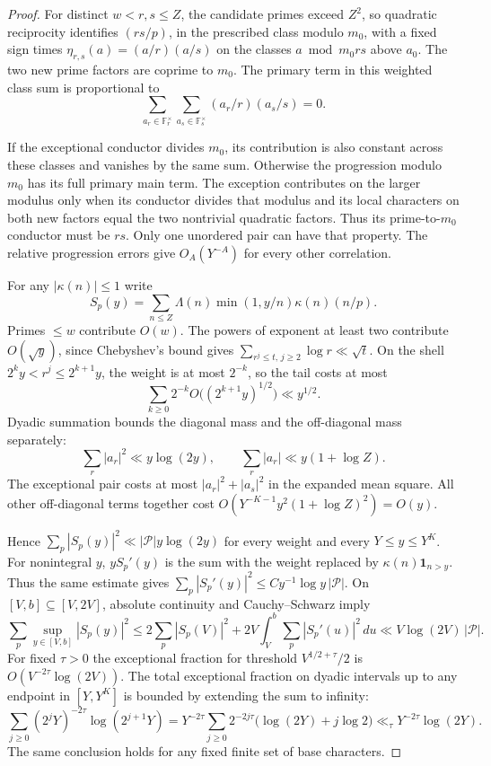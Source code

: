 \begin{proof}
For distinct \(w<r,s\le Z\), the candidate primes exceed \(Z^2\),
so quadratic reciprocity identifies \((rs/p)\), in the prescribed
class modulo \(m_0\), with a fixed sign times
\(\eta_{r,s}(a)=(a/r)(a/s)\) on the classes \(a\bmod m_0rs\)
above \(a_0\). The two new prime factors are coprime to \(m_0\).
The primary term in this weighted class sum is proportional to
\[
       \sum_{a_r\in\mathbb F_r^\times}
       \sum_{a_s\in\mathbb F_s^\times}(a_r/r)(a_s/s)=0.
\]

If the exceptional conductor divides \(m_0\), its contribution is
also constant across these classes and vanishes by the same sum.
Otherwise the progression modulo \(m_0\) has its full primary
main term. The exception contributes on the larger modulus only
when its conductor divides that modulus and its local characters
on both new factors equal the two nontrivial quadratic factors.
Thus its prime-to-\(m_0\) conductor must be \(rs\).
Only one unordered pair can have that property. The relative
progression errors give \(O_A(Y^{-A})\) for every other correlation.

For any \(|\kappa(n)|\le1\) write
\[
 S_p(y)=\sum_{n\le Z}\Lambda(n)\min(1,y/n)\kappa(n)(n/p).
\]
Primes \(\le w\) contribute \(O(w)\). The powers of exponent at
least two contribute \(O(\sqrt y)\), since Chebyshev's bound gives
\(\sum_{r^j\le t,\,j\ge2}\log r\ll\sqrt t\).
On the shell \(2^k y<r^j\le2^{k+1}y\), the weight is at most
\(2^{-k}\), so the tail costs at most
\[
 \sum_{k\ge0}2^{-k} O\bigl((2^{k+1}y)^{1/2}\bigr)\ll y^{1/2}.
\] Dyadic summation bounds the diagonal mass and the off-diagonal mass separately:
\[
 \sum_r |a_r|^2\ll y\log(2y),\qquad \sum_r |a_r|\ll y(1+\log Z).
\]
The exceptional pair costs at
most \(|a_r|^2+|a_s|^2\) in the expanded mean square. All other
off-diagonal terms together cost
\(O(Y^{-K-1}y^2(1+\log Z)^2)=O(y)\).

Hence \(\sum_p|S_p(y)|^2\ll |\mathcal P| y\log(2y)\) for every
weight and every \(Y\le y\le Y^K\). For nonintegral
\(y\), \(yS_p'(y)\) is the sum with the weight replaced by
\(\kappa(n)\mathbf 1_{n>y}\). Thus the same estimate gives
\(\sum_p |S_p'(y)|^2\le C y^{-1}\log y\,|\mathcal P|\).
On \([V,b]\subseteq[V,2V]\), absolute continuity and
Cauchy--Schwarz imply
\[
 \sum_p\sup_{y\in[V,b]}|S_p(y)|^2
 \le 2\sum_p|S_p(V)|^2
      +2V\int_V^b\sum_p|S_p'(u)|^2\,du
 \ll V\log(2V)\,|\mathcal P|.
\]
For fixed \(\tau>0\) the exceptional fraction for threshold
\(V^{1/2+\tau}/2\) is \(O(V^{-2\tau}\log(2V))\).
The total exceptional fraction on dyadic intervals up to any endpoint
in \([Y,Y^K]\) is bounded by extending the sum to infinity:
\[
 \sum_{j\ge0}(2^jY)^{-2\tau}\log(2^{j+1}Y)
 =Y^{-2\tau}\sum_{j\ge0}2^{-2j\tau}
            \bigl(\log(2Y)+j\log2\bigr)
 \ll_\tau Y^{-2\tau}\log(2Y).
\] The same conclusion holds for
any fixed finite set of base characters.


\end{proof}

